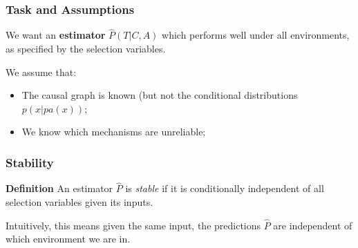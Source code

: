 \documentclass{beamer}
\begin{document}
\begin{frame}
\frametitle{Task and Assumptions}
We want an \textbf{estimator} $\hat{P}(T|C, A)$ which performs well under all environments, as specified by the selection variables.

\bigskip
We assume that:
\begin{itemize}
\item The causal graph is known (but not the conditional distributions $p(x|pa(x))$;
\item We know which mechanisms are unreliable;
\end{itemize}

\end{frame}

\begin{frame}
\frametitle{Stability}

\textbf{Definition} An estimator $\hat{P}$ is \textit{stable} if it is conditionally independent of all selection variables given its inputs.

\begin{figure}[ht]
\begin{subfigure}{.4\linewidth}
  \centering
  \label{fig:tt}
\end{subfigure}
\begin{subfigure}{.4\linewidth}
  \centering
  \label{fig:d}
\end{subfigure}
\label{fig:ef}
\end{figure}

Intuitively, this means given the same input, the predictions $\hat{P}$ are independent of which environment we are in.

\end{frame}
\end{document}
